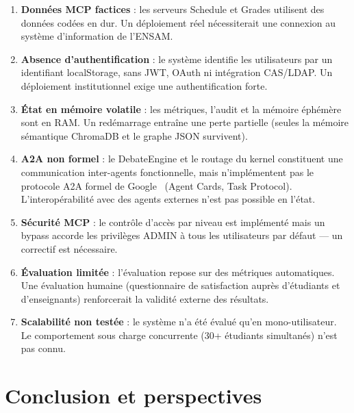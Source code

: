 \documentclass[12pt, a4paper]{article}
\begin{document}
\begin{enumerate}
  \item \textbf{Données MCP factices} : les serveurs Schedule et Grades utilisent des données codées en dur. Un déploiement réel nécessiterait une connexion au système d'information de l'ENSAM.

  \item \textbf{Absence d'authentification} : le système identifie les utilisateurs par un identifiant localStorage, sans JWT, OAuth ni intégration CAS/LDAP. Un déploiement institutionnel exige une authentification forte.

  \item \textbf{État en mémoire volatile} : les métriques, l'audit et la mémoire éphémère sont en RAM. Un redémarrage entraîne une perte partielle (seules la mémoire sémantique ChromaDB et le graphe JSON survivent).

  \item \textbf{A2A non formel} : le DebateEngine et le routage du kernel constituent une communication inter-agents fonctionnelle, mais n'implémentent pas le protocole A2A formel de Google~\cite{google2025a2a} (Agent Cards, Task Protocol). L'interopérabilité avec des agents externes n'est pas possible en l'état.

  \item \textbf{Sécurité MCP} : le contrôle d'accès par niveau est implémenté mais un bypass accorde les privilèges ADMIN à tous les utilisateurs par défaut — un correctif est nécessaire.

  \item \textbf{Évaluation limitée} : l'évaluation repose sur des métriques automatiques. Une évaluation humaine (questionnaire de satisfaction auprès d'étudiants et d'enseignants) renforcerait la validité externe des résultats.

  \item \textbf{Scalabilité non testée} : le système n'a été évalué qu'en mono-utilisateur. Le comportement sous charge concurrente (30+ étudiants simultanés) n'est pas connu.
\end{enumerate}


\section{Conclusion et perspectives}
\label{chap:conclusion}
\end{document}
